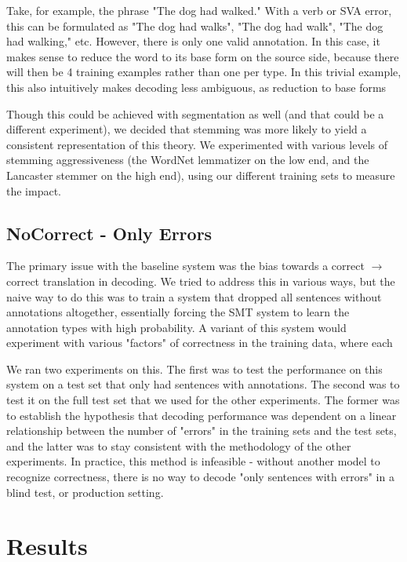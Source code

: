 \documentclass[11pt,letterpaper]{article}
\begin{document}
Take, for example, the phrase "The dog had walked." With a verb or SVA error, this can be formulated as "The dog had walks", "The dog had walk", "The dog had walking," etc. However, there is only one valid annotation. In this case, it makes sense to reduce the word to its base form on the source side, because there will then be 4 training examples rather than one per type. In this trivial example, this also intuitively makes decoding less ambiguous, as reduction to base forms 

Though this could be achieved with segmentation as well (and that could be a different experiment), we decided that stemming was more likely to yield a consistent representation of this theory. We experimented with various levels of stemming aggressiveness (the WordNet lemmatizer on the low end, and the Lancaster stemmer on the high end), using our different training sets to measure the impact.

\subsection{NoCorrect - Only Errors}

The primary issue with the baseline system was the bias towards a correct $\rightarrow$ correct translation in decoding. We tried to address this in various ways, but the naive way to do this was to train a system that dropped all sentences without annotations altogether, essentially forcing the SMT system to learn the annotation types with high probability. A variant of this system would experiment with various "factors" of correctness in the training data, where each 

We ran two experiments on this. The first was to test the performance on this system on a test set that only had sentences with annotations. The second was to test it on the full test set that we used for the other experiments. The former was to establish the hypothesis that decoding performance was dependent on a linear relationship between the number of "errors" in the training sets and the test sets, and the latter was to stay consistent with the methodology of the other experiments. In practice, this method is infeasible - without another model to recognize correctness, there is no way to decode "only sentences with errors" in a blind test, or production setting.


\section{Results}
\end{document}
